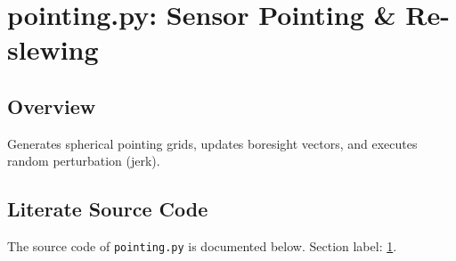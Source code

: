 \documentclass[10pt,a4paper]{report}
\begin{document}
\chapter{pointing.py: Sensor Pointing \& Re-slewing}
\label{sec:pointing}

\section*{Overview}
Generates spherical pointing grids, updates boresight vectors, and executes random perturbation (jerk).

\section*{Literate Source Code}
The source code of \texttt{pointing.py} is documented below. Section label: \ref{sec:pointing}.
\end{document}
